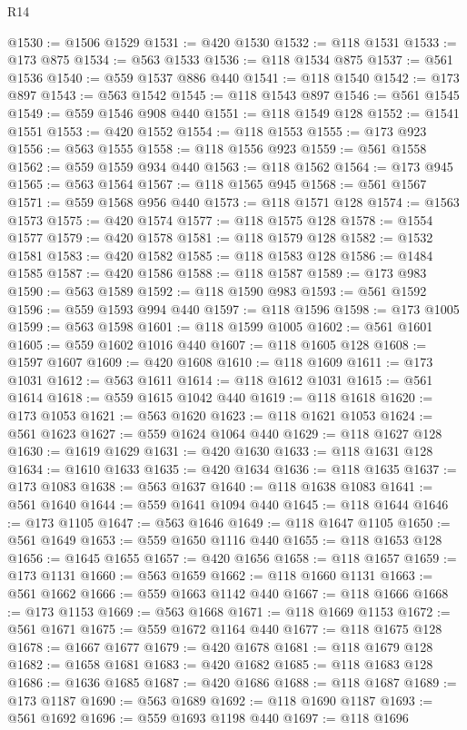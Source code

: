 \begin{lexlean}{R14}
\begin{coremodule}
@1530 := @1506 @1529
@1531 := @420 @1530
@1532 := @118 @1531
@1533 := @173 @875
@1534 := @563 @1533
@1536 := @118 @1534 @875
@1537 := @561 @1536
@1540 := @559 @1537 @886 @440
@1541 := @118 @1540
@1542 := @173 @897
@1543 := @563 @1542
@1545 := @118 @1543 @897
@1546 := @561 @1545
@1549 := @559 @1546 @908 @440
@1551 := @118 @1549 @128
@1552 := @1541 @1551
@1553 := @420 @1552
@1554 := @118 @1553
@1555 := @173 @923
@1556 := @563 @1555
@1558 := @118 @1556 @923
@1559 := @561 @1558
@1562 := @559 @1559 @934 @440
@1563 := @118 @1562
@1564 := @173 @945
@1565 := @563 @1564
@1567 := @118 @1565 @945
@1568 := @561 @1567
@1571 := @559 @1568 @956 @440
@1573 := @118 @1571 @128
@1574 := @1563 @1573
@1575 := @420 @1574
@1577 := @118 @1575 @128
@1578 := @1554 @1577
@1579 := @420 @1578
@1581 := @118 @1579 @128
@1582 := @1532 @1581
@1583 := @420 @1582
@1585 := @118 @1583 @128
@1586 := @1484 @1585
@1587 := @420 @1586
@1588 := @118 @1587
@1589 := @173 @983
@1590 := @563 @1589
@1592 := @118 @1590 @983
@1593 := @561 @1592
@1596 := @559 @1593 @994 @440
@1597 := @118 @1596
@1598 := @173 @1005
@1599 := @563 @1598
@1601 := @118 @1599 @1005
@1602 := @561 @1601
@1605 := @559 @1602 @1016 @440
@1607 := @118 @1605 @128
@1608 := @1597 @1607
@1609 := @420 @1608
@1610 := @118 @1609
@1611 := @173 @1031
@1612 := @563 @1611
@1614 := @118 @1612 @1031
@1615 := @561 @1614
@1618 := @559 @1615 @1042 @440
@1619 := @118 @1618
@1620 := @173 @1053
@1621 := @563 @1620
@1623 := @118 @1621 @1053
@1624 := @561 @1623
@1627 := @559 @1624 @1064 @440
@1629 := @118 @1627 @128
@1630 := @1619 @1629
@1631 := @420 @1630
@1633 := @118 @1631 @128
@1634 := @1610 @1633
@1635 := @420 @1634
@1636 := @118 @1635
@1637 := @173 @1083
@1638 := @563 @1637
@1640 := @118 @1638 @1083
@1641 := @561 @1640
@1644 := @559 @1641 @1094 @440
@1645 := @118 @1644
@1646 := @173 @1105
@1647 := @563 @1646
@1649 := @118 @1647 @1105
@1650 := @561 @1649
@1653 := @559 @1650 @1116 @440
@1655 := @118 @1653 @128
@1656 := @1645 @1655
@1657 := @420 @1656
@1658 := @118 @1657
@1659 := @173 @1131
@1660 := @563 @1659
@1662 := @118 @1660 @1131
@1663 := @561 @1662
@1666 := @559 @1663 @1142 @440
@1667 := @118 @1666
@1668 := @173 @1153
@1669 := @563 @1668
@1671 := @118 @1669 @1153
@1672 := @561 @1671
@1675 := @559 @1672 @1164 @440
@1677 := @118 @1675 @128
@1678 := @1667 @1677
@1679 := @420 @1678
@1681 := @118 @1679 @128
@1682 := @1658 @1681
@1683 := @420 @1682
@1685 := @118 @1683 @128
@1686 := @1636 @1685
@1687 := @420 @1686
@1688 := @118 @1687
@1689 := @173 @1187
@1690 := @563 @1689
@1692 := @118 @1690 @1187
@1693 := @561 @1692
@1696 := @559 @1693 @1198 @440
@1697 := @118 @1696

\end{coremodule}
\end{lexlean}
